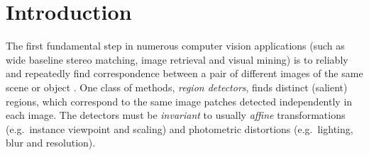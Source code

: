 \documentclass[conference,compsoc]{IEEEtran}
\begin{document}




%
\IEEEpeerreviewmaketitle


\section{Introduction}
\label{sec:intro}
The first fundamental step in numerous computer vision applications (such as wide baseline stereo matching, image retrieval and visual mining) is to reliably and repeatedly find correspondence between a pair of different images of the same scene or object \cite{Matas2002BMVC, Rodriguez2013, EscaleraCVPR07}. One class of methods, {\em region detectors}, finds distinct (salient) regions, which correspond to the same image patches detected independently in each image. The detectors must be {\em invariant} to usually {\em affine} transformations (e.g.~instance viewpoint and scaling) and photometric distortions (e.g.~lighting, blur and resolution). 
\end{document}
